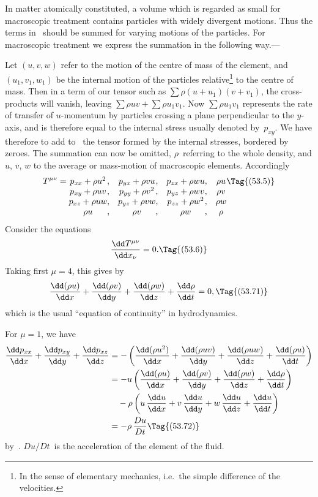 \documentclass[12pt]{book}
\begin{document}
In matter atomically constituted, a volume which is regarded as small for
macroscopic treatment contains particles with widely divergent motions. Thus
the terms in~ should be summed for varying motions of the particles.
For macroscopic treatment we express the summation in the following way.---

{\Loosen Let $(u, v, w)$ refer to the motion of the centre of mass of the element, and
%
$(u_{1}, v_{1}, w_{1})$ be the internal motion of the particles relative\footnote
  {In the sense of elementary mechanics, i.e.\ the simple difference of the velocities.}
to the centre of
mass. Then in a term of our tensor such as $\sum \rho(u + u_{1})(v + v_{1})$, the cross\hyp{}products
will vanish, leaving $\sum \rho u v + \sum \rho u_{1}v_{1}$. Now $\sum \rho u_{1}v_{1}$ represents the rate of
transfer of $u$-momentum by particles crossing a plane perpendicular to the
$y$-axis, and is therefore equal to the internal stress usually denoted by~$p_{xy}$.
We have therefore to add to~ the tensor formed by the internal stresses,
bordered by zeroes. The summation can now be omitted, $\rho$~referring to the
whole density, and $u$, $v$, $w$ to the average or mass\hyp{}motion of macroscopic
elements. Accordingly}
\[
T^{\mu\nu} =
\begin{array}[t]{@{}c@{,\quad}c@{,\quad}c@{,\quad}c@{}}
  p_{xx} + \rho u^2 & p_{yx} + \rho v u & p_{zx} + \rho w u & \rho u\\
  p_{xy} + \rho u v & p_{yy} + \rho v^2 & p_{yz} + \rho w v & \rho v\\
  p_{xz} + \rho u w & p_{yz} + \rho v w & p_{zz} + \rho w^{2} & \rho w\\
  \rho u & \rho v & \rho w & \rho\\
\end{array}
\Tag{(53.5)}
\]
Consider the equations
\[
\frac{\dd T^{\mu\nu}}{\dd x_{\nu}} = 0.
\Tag{(53.6)}
\]
Taking first $\mu = 4$, this gives by~
\[
\frac{\dd(\rho u)}{\dd x} + \frac{\dd(\rho v)}{\dd y} + \frac{\dd(\rho w)}{\dd z} + \frac{\dd\rho}{\dd t} = 0,
\Tag{(53.71)}
\]
which is the usual ``equation of continuity'' in hydrodynamics.
%
%

For $\mu = 1$, we have
\begin{align*}
  \frac{\dd p_{xx}}{\dd x} + \frac{\dd p_{xy}}{\dd y} + \frac{\dd p_{xz}}{\dd z}
  &= -\left(\frac{\dd(\rho u^2)}{\dd x} + \frac{\dd(\rho u v)}{\dd y}
          + \frac{\dd(\rho u w)}{\dd z} + \frac{\dd(\rho u)}{\dd t}\right) \\
  &= -u \left(\frac{\dd(\rho u)}{\dd x} + \frac{\dd(\rho v)}{\dd y}
          + \frac{\dd(\rho w)}{\dd z} + \frac{\dd\rho}{\dd t}\right) \\
  &\quad -\rho \left(u\, \frac{\dd u}{\dd x} + v\, \frac{\dd u}{\dd y}
          + w\, \frac{\dd u}{\dd z} + \frac{\dd u}{\dd t}\right) \\
  &= -\rho\, \frac{Du}{Dt}
\Tag{(53.72)}
\end{align*}
by~. $Du/Dt$~is the acceleration of the element of the fluid.
\end{document}
